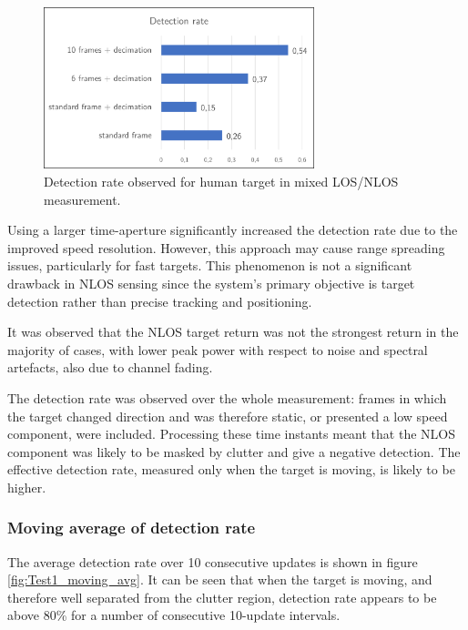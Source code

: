 \begin{figure}[H]
	\centering
	\includegraphics[width=0.7\textwidth]{Images/Test1/detect_hist.png}
	\caption{Detection rate observed for human target in mixed LOS/NLOS measurement.}
	\label{fig:Test1_detect_hist}
\end{figure}

Using a larger time-aperture significantly increased the detection rate due to the improved speed resolution. However, this approach may cause range spreading issues, particularly for fast targets. This phenomenon is not a significant drawback in NLOS sensing since the system's primary objective is target detection rather than precise tracking and positioning.

It was observed that the NLOS target return was not the strongest return in the majority of cases, with lower peak power with respect to noise and spectral artefacts, also due to channel fading.

The detection rate was observed over the whole measurement: frames in which the target changed direction and was therefore static, or presented a low speed component, were included. Processing these time instants meant that the NLOS component was likely to be masked by clutter and give a negative detection. The effective detection rate, measured only when the target is moving, is likely to be higher.

\subsubsection{Moving average of detection rate}


The average detection rate over 10 consecutive updates is shown in figure \ref{fig:Test1_moving_avg}. It can be seen that when the target is moving, and therefore  well separated from the clutter region, detection rate appears to be above 80\% for a number of consecutive 10-update intervals.

